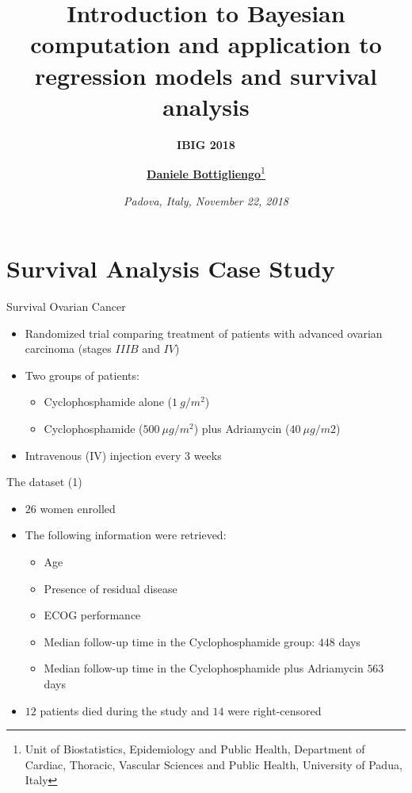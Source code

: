 \documentclass[ignorenonframetext,a4paper]{beamer}
\title{\Large\textbf{Introduction to Bayesian computation and application to regression models and survival analysis}}
\subtitle{\large\textbf{\textrm{IBIG 2018}}}
\author{\centering\underline{\textbf{Daniele Bottigliengo}}\thanks{\tiny Unit of Biostatistics, Epidemiology and Public Health, Department of \newline Cardiac, Thoracic, Vascular Sciences and Public Health, University of Padua, Italy}}
\date{\centering\emph{Padova, Italy, November 22, 2018}}
\begin{document}
\frame{\titlepage}

\section{Survival Analysis Case
Study}\label{survival-analysis-case-study}

\begin{frame}{Survival Ovarian Cancer}

\begin{itemize}
\setlength\itemsep{1em}
  \item{Randomized trial comparing treatment of patients with advanced
        ovarian carcinoma (stages $IIIB$ and $IV$)}
  \item{Two groups of patients:}
  \begin{itemize}
    \item{Cyclophosphamide alone ($1 \> g/m^{2}$)}
    \item{Cyclophosphamide ($500 \> \mu g/m^{2}$) plus Adriamycin 
        ($40 \> \mu g/m2$)}
  \end{itemize}
\item{Intravenous (IV) injection every $3$ weeks}
\end{itemize}

\end{frame}

\begin{frame}{The dataset (1)}

\begin{itemize}
\setlength\itemsep{1em}
  \item{$26$ women enrolled}
  \item{The following information were retrieved:}
  \begin{itemize}
    \item{Age}
    \item{Presence of residual disease}
    \item{ECOG performance}
    \item{Median follow-up time in the Cyclophosphamide group: 
          $448$ days}
    \item{Median follow-up time in the Cyclophosphamide plus 
          Adriamycin $563$ days}
  \end{itemize}
\item{$12$ patients died during the study and $14$ were right-censored}
\end{itemize}

\end{frame}
\end{document}
